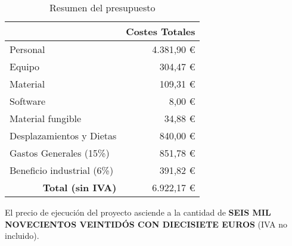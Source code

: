 \begin{table}[H]
	\centering
	\caption{Resumen del presupuesto}
	\label{tab:presupuesto_total}
	\begin{tabular}{l|r|}
		\hline
		\rowcolor[HTML]{BFBFBF}
		\multicolumn{1}{|c|}{\cellcolor[HTML]{BFBFBF}\textbf{Presupuestos}} & \multicolumn{1}{c|}{\cellcolor[HTML]{BFBFBF}\textbf{Costes Totales}} \\ \hline
		\multicolumn{1}{|l|}{Personal}                                      & 4.381,90 €                                                           \\ \hline
		\multicolumn{1}{|l|}{Equipo}                                        & 304,47 €                                                             \\ \hline
		\multicolumn{1}{|l|}{Material}                                      & 109,31 €                                                             \\ \hline
		\multicolumn{1}{|l|}{Software}                                      & 8,00 €                                                               \\ \hline
		\multicolumn{1}{|l|}{Material fungible}                             & 34,88 €                                                              \\ \hline
		\multicolumn{1}{|l|}{Desplazamientos y Dietas}                      & 840,00 €                                                             \\ \hline
		\multicolumn{1}{|l|}{Gastos Generales (15\%)}                       & 851,78		€                                                              \\ \hline
		\multicolumn{1}{|l|}{Beneficio industrial (6\%)}                    & 391,82 €                                                             \\ \hline
		\multicolumn{1}{r|}{\textbf{Total (sin IVA)}}                       & 6.922,17 €                                                           \\ \cline{2-2}
	\end{tabular}
\end{table}

\noindent
El precio de ejecución del proyecto asciende a la cantidad de \MakeUppercase{\textbf{seis mil novecientos veintidós con diecisiete euros}} (IVA no incluido).